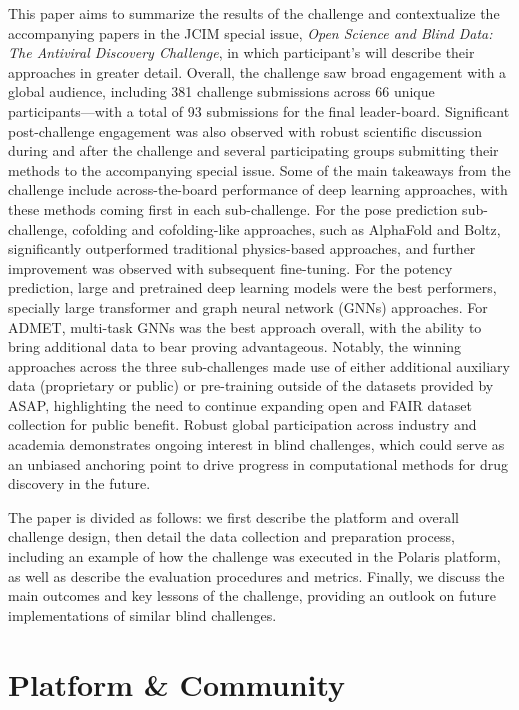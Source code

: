 \documentclass[journal=jcim,manuscript=article]{achemso}
\begin{document}
This paper aims to summarize the results of the challenge and contextualize the accompanying papers in the JCIM special issue, \textit{Open Science and Blind Data: The Antiviral Discovery Challenge}, in which participant's will describe their approaches in greater detail. Overall, the challenge saw broad engagement with a global audience, including 381 challenge submissions across 66 unique participants---with a total of 93 submissions for the final leader-board. Significant post-challenge engagement was also observed with robust scientific discussion during and after the challenge and several participating groups submitting their methods to the accompanying special issue. Some of the main takeaways from the challenge include across-the-board performance of deep learning approaches, with these methods coming first in each sub-challenge. For the pose prediction sub-challenge, cofolding and cofolding-like approaches, such as AlphaFold and Boltz, significantly outperformed traditional physics-based approaches, and further improvement was observed with subsequent fine-tuning. For the potency prediction, large and pretrained deep learning models were the best performers, specially large transformer and graph neural network (GNNs) approaches. For ADMET, multi-task GNNs was the best approach overall, with the ability to bring additional data to bear proving advantageous. Notably, the winning approaches across the three sub-challenges made use of either additional auxiliary data (proprietary or public) or pre-training outside of the datasets provided by ASAP, highlighting the need to continue expanding open and FAIR dataset collection for public benefit. Robust global participation across industry and academia demonstrates ongoing interest in blind challenges, which could serve as an unbiased anchoring point to drive progress in computational methods for drug discovery in the future. 

The paper is divided as follows: we first describe the platform and overall challenge design, then detail the data collection and preparation process, including an example of how the challenge was executed in the Polaris platform, as well as describe the evaluation procedures and metrics. Finally, we discuss the main outcomes and key lessons of the challenge, providing an outlook on future implementations of similar blind challenges.

\section{Platform \& Community}
\end{document}
